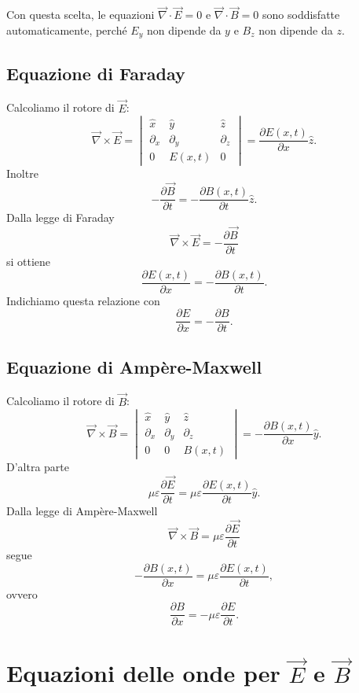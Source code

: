 \documentclass[a4paper]{article}
\begin{document}
Con questa scelta, le equazioni \(\vec{\nabla}\cdot\vec{E}=0\) e \(\vec{\nabla}\cdot\vec{B}=0\) sono soddisfatte automaticamente, perché \(E_y\) non dipende da \(y\) e \(B_z\) non dipende da \(z\).

\subsection{Equazione di Faraday}

Calcoliamo il rotore di \(\vec{E}\):
\[
\vec{\nabla}\times\vec{E}
=
\begin{vmatrix}
    \hat{x} & \hat{y} & \hat{z} \\
    \partial_x & \partial_y & \partial_z \\
    0 & E(x,t) & 0
\end{vmatrix}
=\frac{\partial E(x,t)}{\partial x}\hat{z}.
\]
Inoltre
\[
-\frac{\partial\vec{B}}{\partial t}
=-\frac{\partial B(x,t)}{\partial t}\hat{z}.
\]
Dalla legge di Faraday
\[
\vec{\nabla}\times\vec{E}=-\frac{\partial\vec{B}}{\partial t}
\]
si ottiene
\[
\frac{\partial E(x,t)}{\partial x}=-\frac{\partial B(x,t)}{\partial t}.
\]
Indichiamo questa relazione con
\[
\boxed{\frac{\partial E}{\partial x}=-\frac{\partial B}{\partial t}}.
\]

\subsection{Equazione di Ampère-Maxwell}

Calcoliamo il rotore di \(\vec{B}\):
\[
\vec{\nabla}\times\vec{B}
=
\begin{vmatrix}
    \hat{x} & \hat{y} & \hat{z} \\
    \partial_x & \partial_y & \partial_z \\
    0 & 0 & B(x,t)
\end{vmatrix}
=-\frac{\partial B(x,t)}{\partial x}\hat{y}.
\]
D'altra parte
\[
\mu\varepsilon\frac{\partial\vec{E}}{\partial t}
=\mu\varepsilon\frac{\partial E(x,t)}{\partial t}\hat{y}.
\]
Dalla legge di Ampère-Maxwell
\[
\vec{\nabla}\times\vec{B}=\mu\varepsilon\frac{\partial\vec{E}}{\partial t}
\]
segue
\[
-\frac{\partial B(x,t)}{\partial x}=\mu\varepsilon\frac{\partial E(x,t)}{\partial t},
\]
ovvero
\[
\boxed{\frac{\partial B}{\partial x}=-\mu\varepsilon\frac{\partial E}{\partial t}}.
\]

\section{Equazioni delle onde per \(\vec{E}\) e \(\vec{B}\)}
\end{document}
